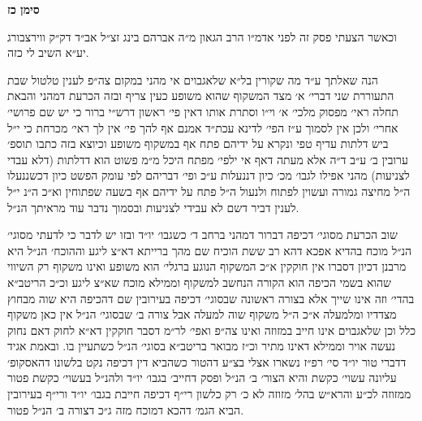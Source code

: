 \documentclass[12pt, openany]{book}
\newcommand{\chapname}{}
\newcommand{\newchap}[1]{
	\addcontentsline{toc}{chapter}{#1}
	\renewcommand{\chapname}{#1}
		\begin{center}
			\textbf{%
\fontsize{16pt}{16pt}\selectfont
				#1}
		\end{center}
}
\begin{document}
\newchap{סימן כז}
\begin{multicols}{2}
וכאשר הצעתי פסק זה לפני אדמ״ו הרב הגאון מ״ה אברהם בינג זצ״ל אב״ד דק״ק ווירצבורג יע״א השיב לי כזה.\\\vspace{0pt}

הנה שאלתך ע״ד מה שקורין בל״א שלאגבוים אי מהני במקום צה״פ לענין טלטול שבת התעוררת שני דברי׳ א׳ מצד המשקוף שהוא משופע כעין צריף ובזה הכרעת דמהני והבאת תחלה ראי׳ מפסוק מלכי׳ א׳ וי״ו וסתרת אותו דאין פי׳ ראשון דרש״י ברור כי יש שם פרושי׳ אחרי׳ ולכן אין לסמוך ע״ז הפי׳ לדינא עכת״ד אמנם אף להך פי׳ אין לך ראי׳ מכרחת כי י״ל ביש דלתות עדיף טפי ונקרא על ידיהם פתח אף במשקוף משופע וכיוצא בזה כתבו תוספ׳ ערובין ב׳ ע״ב ד״ה אלא מעתה דאף אי ילפי׳ מפתח היכל מ״מ פשוט הוא דדלתות (דלא עבדי לצניעות) מהני אפילו לגבו׳ מכ׳ כיון דננעלות ע״כ ופי׳ דבריהם לפי עומק הפשט כיון דכשננעלו ה״ל מחיצה גמורה ועשוין לפתוח ולנעול ה״ל פתח על ידיהם אף בשעה שפתוחין וא״כ ה״נ י״ל לענין דביר דשם לא עבידי לצניעות ובסמוך נדבר עוד מראיתך הנ״ל.\\\vspace{0pt}

שוב הכרעת מסוגי׳ דכיפה דברור דמהני ברחב ד׳ כשגבו׳ יו״ד ובזו יש לדבר כי לדעתי מסוגי׳ הנ״ל מוכח בהדיא אפכא דהא רב ששת הוכיח שם מהך ברייתא דא״צ ליגע וההוכח׳ הנ״ל היא מרבנן דכיון דסברו אין חוקקין א״כ המשקוף הנוגע ברגלי׳ הוא משופע ואינו משקוף רק השיווי שהוא בשמי הכיפה הוא הקורה הנחשב למשקוף וממילא מוכח שא״צ ליגע וכ״כ הריטב״א בהדי׳ וזה אינו שייך אלא בצורה ראשונה שבסוגי׳ דכיפה בעירובין שם דהכיפה היא שוה מבחוץ מצדדיו ומלמעלה א״כ ה״ל משקוף שוה למעלה אבל צורה ב׳ שבסוגי׳ הנ״ל אין כאן משקוף כלל וכן שלאגבוים אינו חייב במזוזה ואינו צה״פ ואפי׳ לר״מ דסבר חוקקין דא״א לחוק דאם נחוק נעשה אויר וממילא דאינו מתיר וכ״ז מבואר בריטב״א בסוגי׳ הנ״ל כשתעיין בו. ובאמת אגיד דדברי טור יו״ד סי׳ רפ״ז נשארו אצלי בצ״ע דהטור כשהביא דין דכיפה נקט בלשונו דהאסקופ׳ עליונה עשוי׳ כקשת והיא הצור׳ ב׳ הנ״ל ופסק דחייב׳ בגבו׳ יו״ד ולהנ״ל בעשוי׳ כקשת פטור ממזוזה לכ״ע והרא״ש בהל׳ מזוזה לא כ׳ רק כלשון רי״ף דכיפה חייבת בגבו׳ יו״ד ורי״ף בעירובין הביא הגמ׳ דהכא דמוכח מזה ג״כ דצורה ב׳ הנ״ל פטור.\\\vspace{0pt}


\end{multicols}
\end{document}

